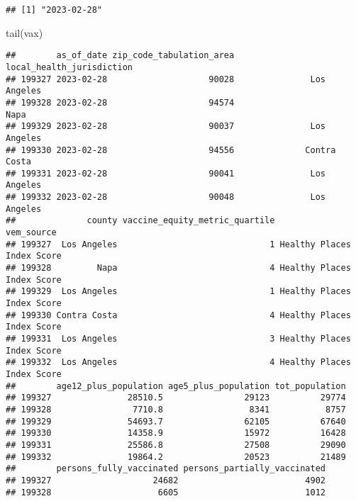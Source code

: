 \documentclass[
]{article}
\newenvironment{Shaded}{\begin{snugshade}}{\end{snugshade}}
\newcommand{\FunctionTok}[1]{\textcolor[rgb]{0.00,0.00,0.00}{#1}}
\newcommand{\NormalTok}[1]{#1}
\newcommand{\SpecialCharTok}[1]{\textcolor[rgb]{0.00,0.00,0.00}{#1}}
\begin{document}
\begin{Shaded}
\end{Shaded}

\begin{verbatim}
## [1] "2023-02-28"
\end{verbatim}

\begin{Shaded}
\begin{Highlighting}[]
\FunctionTok{tail}\NormalTok{(vax)}
\end{Highlighting}
\end{Shaded}

\begin{verbatim}
##        as_of_date zip_code_tabulation_area local_health_jurisdiction
## 199327 2023-02-28                    90028               Los Angeles
## 199328 2023-02-28                    94574                      Napa
## 199329 2023-02-28                    90037               Los Angeles
## 199330 2023-02-28                    94556              Contra Costa
## 199331 2023-02-28                    90041               Los Angeles
## 199332 2023-02-28                    90048               Los Angeles
##              county vaccine_equity_metric_quartile                 vem_source
## 199327  Los Angeles                              1 Healthy Places Index Score
## 199328         Napa                              4 Healthy Places Index Score
## 199329  Los Angeles                              1 Healthy Places Index Score
## 199330 Contra Costa                              4 Healthy Places Index Score
## 199331  Los Angeles                              3 Healthy Places Index Score
## 199332  Los Angeles                              4 Healthy Places Index Score
##        age12_plus_population age5_plus_population tot_population
## 199327               28510.5                29123          29774
## 199328                7710.8                 8341           8757
## 199329               54693.7                62105          67640
## 199330               14358.9                15972          16428
## 199331               25586.8                27508          29090
## 199332               19864.2                20523          21489
##        persons_fully_vaccinated persons_partially_vaccinated
## 199327                    24682                         4902
## 199328                     6605                         1012

\end{verbatim}
\end{document}
